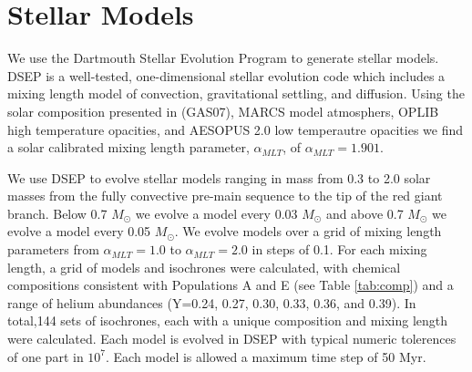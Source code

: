 \section{Stellar Models}\label{sec:modeling}
We use the Dartmouth Stellar Evolution Program \citep[DSEP, ][]{Dotter2008} to
generate stellar models. DSEP is a well-tested, one-dimensional stellar
evolution code which includes a mixing length model of convection,
gravitational settling, and diffusion. Using the solar composition presented in
\citep{Grevesse2007} (GAS07), MARCS model atmosphers, OPLIB high temperature
opacities, and AESOPUS 2.0 low temperautre opacities we find a solar calibrated
mixing length parameter, $\alpha_{MLT}$, of $\alpha_{MLT} = 1.901$.

We use DSEP to evolve stellar models ranging in mass from 0.3 to 2.0 solar
masses from the fully convective pre-main sequence to the tip of the red giant
branch. Below 0.7 $M_{\odot}$ we evolve a model every 0.03 $M_{\odot}$ and
above 0.7 $M_{\odot}$ we evolve a model every 0.05 $M_{\odot}$. We evolve
models over a grid of mixing length parameters from $\alpha_{MLT} = 1.0$ to
$\alpha_{MLT} = 2.0$ in steps of 0.1. For each mixing length, a grid of models
and isochrones were calculated, with chemical compositions consistent with
Populations A and E (see Table \ref{tab:comp}) and a range of helium abundances
(Y=0.24, 0.27, 0.30, 0.33, 0.36, and 0.39). In total,144 sets of isochrones,
each with a unique composition and mixing length were calculated. Each model is
evolved in DSEP with typical numeric tolerences of one part in $10^{7}$. Each
model is allowed a maximum time step of 50 Myr. 

